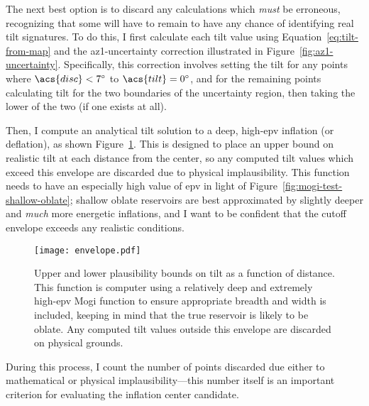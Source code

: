 The next best option is to discard any calculations which \emph{must} be erroneous, recognizing that some will have to remain to have any chance of identifying real tilt signatures. To do this, I first calculate each tilt value using Equation~\eqref{eq:tilt-from-map} and the \acs{az1}-uncertainty correction illustrated in Figure~\ref{fig:az1-uncertainty}. Specifically, this correction involves setting the tilt for any points where $\acs{disc}<\ang{7}$ to $\acs{tilt}=\ang{0}$, and for the remaining points calculating \acs{tilt} for the two boundaries of the uncertainty region, then taking the lower of the two (if one exists at all).

Then, I compute an analytical tilt solution to a deep, high-\acs{epv} inflation (or deflation), as shown Figure~\ref{fig:envelope}. This is designed to place an upper bound on realistic tilt at each distance from the center, so any computed tilt values which exceed this envelope are discarded due to physical implausibility. This function needs to have an especially high value of \acs{epv} in light of Figure~\ref{fig:mogi-test-shallow-oblate}; shallow oblate reservoirs are best approximated by slightly deeper and \emph{much} more energetic inflations, and I want to be confident that the cutoff envelope exceeds any realistic conditions.

\begin{figure}
    \texttt{[image: envelope.pdf]}%
    \caption[Physically plausible tilt envelope]{Upper and lower plausibility bounds on tilt as a function of distance. This function is computer using a relatively deep and extremely high-\acs{epv} Mogi function to ensure appropriate breadth and width is included, keeping in mind that the true reservoir is likely to be oblate. Any computed tilt values outside this envelope are discarded on physical grounds.}%
    \label{fig:envelope}
\end{figure}

During this process, I count the number of points discarded due either to mathematical or physical implausibility---this number itself is an important criterion for evaluating the inflation center candidate.

